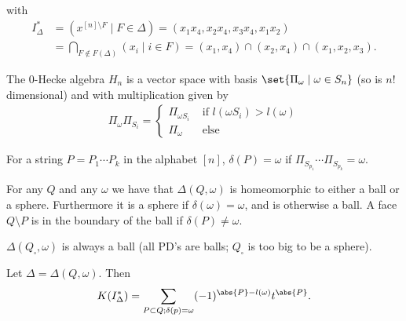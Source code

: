 \begin{example}
\begin{center}
    \end{center}
    with
    \begin{align*}
        I_\Delta^* &= ( x^{[n] \setminus F} \mid F \in \Delta ) = ( x_1  x_4, x_2 x_4 , x_3 x_4 , x_1 x_2 )\\
        &=  \bigcap_{F \notin F(\Delta)} (x_i \mid i \in F) = ( x_1, x_4 ) \cap ( x_2 , x_4 ) \cap ( x_1 , x_2 , x_3).
    \end{align*}
\end{example}

\begin{definition}
    The $0$-Hecke algebra $H_n$ is a vector space with basis $\set{ \Pi_\omega \mid \omega \in S_n}$ (so is $n!$ dimensional) and with multiplication given by
    \begin{align*}
        \Pi_\omega \Pi_{S_i} =
        \begin{cases}
            \Pi_{\omega S_i} & \text{ if } l(\omega S_i ) > l(\omega)\\
            \Pi_\omega & \text{ else}
        \end{cases}
    \end{align*}
\end{definition}

For a string $P = P_1 \cdots P_k$ in the alphabet $[n]$, $\delta (P) = \omega $ if $\Pi_{S_{p_1}} \cdots \Pi_{S_{p_k}} = \omega $.

\begin{theorem}
    For any $Q$ and any $\omega$ we have that $\Delta (Q, \omega) $ is homeomorphic to either a ball or a sphere. Furthermore it is a sphere if $\delta (\omega) = \omega$, and is otherwise a ball. A face $Q \setminus P$ is in the boundary of the ball if $\delta (P) \neq \omega$.
\end{theorem}

\begin{corollary}
    $\Delta (Q_\square , \omega ) $ is always a ball (all PD's are balls; $Q_\square$ is too big to be a sphere).
\end{corollary}

\begin{lemma}
    Let $\Delta = \Delta (Q, \omega)$. Then 
    \begin{align*}
        K( I_\Delta^* ) = \sum_{P \subset Q; \delta (p) = \omega} (-1)^{\abs{P} - l(\omega) } t^{\abs{P}}.
    \end{align*}
\end{lemma}

